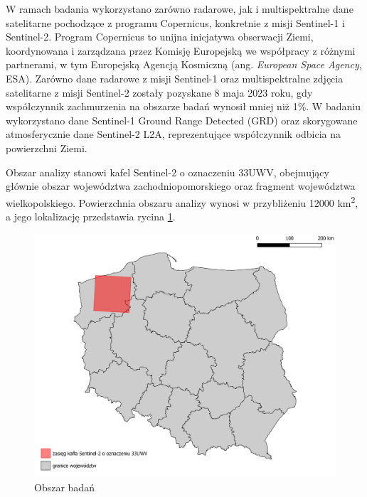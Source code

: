 \documentclass{amuthesis}
\begin{document}
W ramach badania wykorzystano zarówno radarowe, jak i multispektralne
dane satelitarne pochodzące z programu Copernicus, konkretnie z misji
Sentinel-1 i Sentinel-2. Program Copernicus to unijna inicjatywa
obserwacji Ziemi, koordynowana i zarządzana przez Komisję Europejską we
współpracy z różnymi partnerami, w tym Europejską Agencją Kosmiczną
(ang. \emph{European Space Agency}, ESA). Zarówno dane radarowe z misji
Sentinel-1 oraz multispektralne zdjęcia satelitarne z misji Sentinel-2
zostały pozyskane 8 maja 2023 roku, gdy współczynnik zachmurzenia na
obszarze badań wynosił mniej niż 1\%. W badaniu wykorzystano dane
Sentinel-1 Ground Range Detected (GRD) oraz skorygowane atmosferycznie
dane Sentinel-2 L2A, reprezentujące współczynnik odbicia na powierzchni
Ziemi.

Obszar analizy stanowi kafel Sentinel-2 o oznaczeniu 33UWV, obejmujący
głównie obszar województwa zachodniopomorskiego oraz fragment
województwa wielkopolskiego. Powierzchnia obszaru analizy wynosi w
przybliżeniu 12000 km\textsuperscript{2}, a jego lokalizację przedstawia
rycina \ref{fig-rycina-area}.

\begin{figure}[t]

{\centering \includegraphics[width=1\textwidth,height=\textheight]{figures/sen2_extent.png}

}

\caption{\label{fig-rycina-area}Obszar badań}

\end{figure}
\end{document}
